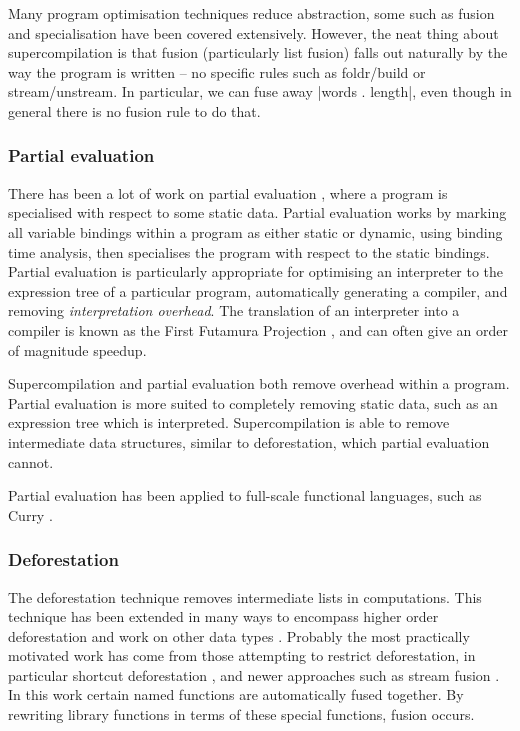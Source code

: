 \documentclass[draft]{sigplanconf}
\begin{document}
Many program optimisation techniques reduce abstraction, some such as fusion and specialisation have been covered extensively. However, the neat thing about supercompilation is that fusion (particularly list fusion) falls out naturally by the way the program is written -- no specific rules such as foldr/build or stream/unstream. In particular, we can fuse away |words . length|, even though in general there is no fusion rule to do that.


\subsubsection{Partial evaluation}

There has been a lot of work on partial evaluation \cite{jones:partial_evaluation}, where a program is specialised with respect to some static data. Partial evaluation works by marking all variable bindings within a program as either static or dynamic, using binding time analysis, then specialises the program with respect to the static bindings. Partial evaluation is particularly appropriate for optimising an interpreter to the expression tree of a particular program, automatically generating a compiler, and removing \textit{interpretation overhead}. The translation of an interpreter into a compiler is known as the First Futamura Projection \cite{futanama:projections}, and can often give an order of magnitude speedup.

Supercompilation and partial evaluation both remove overhead within a program. Partial evaluation is more suited to completely removing static data, such as an expression tree which is interpreted. Supercompilation is able to remove intermediate data structures, similar to deforestation, which partial evaluation cannot.

Partial evaluation has been applied to full-scale functional languages, such as Curry
\cite{albert:partial_evaluation_curry}.

\subsubsection{Deforestation}

The deforestation technique \cite{wadler:deforestation} removes intermediate lists in computations. This technique has been extended in many ways to encompass higher order deforestation \cite{marlow:higher_order_deforestation} and work on other data types \cite{coutts:string_fusion}. Probably the most practically motivated work has come from those attempting to restrict deforestation, in particular shortcut deforestation \cite{gill:shortcut_deforestation}, and newer approaches such as stream fusion \cite{coutts:stream_fusion}. In this work certain named functions are automatically fused together. By rewriting library functions in terms of these special functions, fusion occurs.
\end{document}

